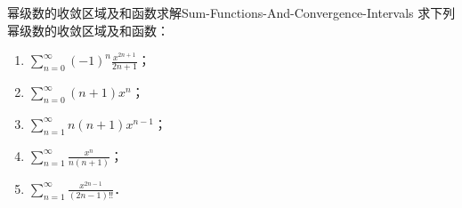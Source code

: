 \begin{problem}{幂级数的收敛区域及和函数求解}{Sum-Functions-And-Convergence-Intervals}
    求下列幂级数的收敛区域及和函数：
    \begin{enumerate}
        \item $\sum_{n=0}^\infty (-1)^n \frac{x^{2n+1}}{2n + 1}$；
        \item $\sum_{n=0}^\infty (n + 1)x^n$；
        \item $\sum_{n=1}^\infty n(n + 1)x^{n-1}$；
        \item $\sum_{n=1}^\infty \frac{x^n}{n(n + 1)}$；
        \item $\sum_{n=1}^\infty \frac{x^{2n-1}}{(2n - 1)!!}$．
    \end{enumerate}
\end{problem}


